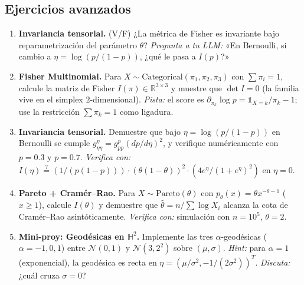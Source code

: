 \subsection*{Ejercicios avanzados}
\begin{enumerate}[resume]
	\item[$\star$] \textbf{Invariancia tensorial.} (V/F) ¿La métrica de Fisher es invariante bajo reparametrización del parámetro $\theta$? \textit{Pregunta a tu LLM:} «En Bernoulli, si cambio a $\eta=\log(p/(1-p))$, ¿qué le pasa a $I(p)$?»
	\item[$\star\star$] \textbf{Fisher Multinomial.} Para $X\sim\mathrm{Categorical}(\pi_1,\pi_2,\pi_3)$ con $\sum\pi_i=1$, calcule la matriz de Fisher $I(\pi)\in\mathbb{R}^{3\times 3}$ y muestre que $\det I=0$ (la familia vive en el simplex $2$-dimensional). \textit{Pista:} el score es $\partial_{\pi_k}\log p = \mathbb{1}_{X=k}/\pi_k - 1$; use la restricción $\sum\pi_k=1$ como ligadura.
	\item[$\star\star\star$] \textbf{Invariancia tensorial.} Demuestre que bajo $\eta=\log(p/(1-p))$ en Bernoulli se cumple $g^{\eta}_{\eta\eta}=g^p_{pp}(dp/d\eta)^2$, y verifique numéricamente con $p=0.3$ y $p=0.7$. \textit{Verifica con:} $I(\eta)\stackrel{?}{=}(1/(p(1-p)))\cdot(\theta(1-\theta))^2 \cdot (4 e^\eta/(1+e^\eta)^2)$ en $\eta=0$.
	\item[$\star\star\star$] \textbf{Pareto + Cramér--Rao.} Para $X\sim\mathrm{Pareto}(\theta)$ con $p_\theta(x)=\theta x^{-\theta-1}$ ($x\ge 1$), calcule $I(\theta)$ y demuestre que $\hat\theta = n/\sum\log X_i$ alcanza la cota de Cramér--Rao asintóticamente. \textit{Verifica con:} simulación con $n=10^5$, $\theta=2$.
	\item[$\star\star\star\star$] \textbf{Mini-proy: Geodésicas en $\mathbb{H}^2$.} Implemente las tres $\alpha$-geodésicas ($\alpha=-1,0,1$) entre $\mathcal{N}(0,1)$ y $\mathcal{N}(3,2^2)$ sobre $(\mu,\sigma)$. \textit{Hint:} para $\alpha=1$ (exponencial), la geodésica es recta en $\eta=(\mu/\sigma^2,-1/(2\sigma^2))^T$. \textit{Discuta:} ¿cuál cruza $\sigma=0$?
\end{enumerate}

